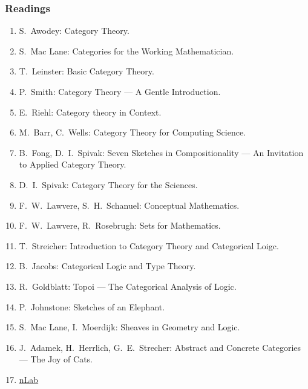 \documentclass[UTF8,11pt,colorlinks,compress,openany]{beamer}%
\begin{document}
\begin{frame}\frametitle{Readings}
\begin{enumerate}\small
	\item S.~Awodey: Category Theory.
	\item S.~Mac Lane: Categories for the Working Mathematician.
	\item T.~Leinster: Basic Category Theory.
	\item P.~Smith: Category Theory --- A Gentle Introduction.
	\item E.~Riehl: Category theory in Context.
	\item M.~Barr, C.~Wells: Category Theory for Computing Science.
	\item B.~Fong, D.~I.~Spivak: Seven Sketches in Compositionality --- An Invitation to Applied Category Theory.
	\item D.~I.~Spivak: Category Theory for the Sciences.
	\item F.~W.~Lawvere, S.~H.~Schanuel: Conceptual Mathematics.
	\item F.~W.~Lawvere, R.~Rosebrugh: Sets for Mathematics.
	\item T.~Streicher: Introduction to Category Theory and Categorical Loigc.
	\item B.~Jacobs: Categorical Logic and Type Theory.
	\item R.~Goldblatt: Topoi --- The Categorical Analysis of Logic.
	\item P.~Johnstone: Sketches of an Elephant.
	\item S.~Mac Lane, I.~Moerdijk: Sheaves in Geometry and Logic.
	\item J.~Adamek, H.~Herrlich, G.~E.~Strecher: Abstract and Concrete Categories --- The Joy of Cats.
	\item \href{https://ncatlab.org/}{nLab}
\end{enumerate}
\end{frame}
\end{document}
